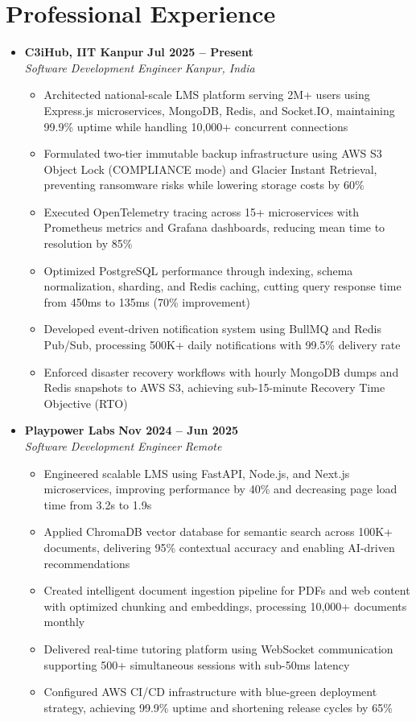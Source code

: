 \documentclass[letterpaper,10pt]{article}
\newcommand{\resumeItem}[1]{\item \small{#1}}
\newcommand{\resumeSubheading}[4]{
\item
\textbf{#1} \hfill \textbf{\small #2} \\
\textit{\small #3} \hfill \textit{\small #4}
\vspace{-4pt}
}
\begin{document}
\section{Professional Experience}
\begin{itemize}[leftmargin=0in, label={}]
\resumeSubheading
{C3iHub, IIT Kanpur}{Jul 2025 -- Present}
{Software Development Engineer}{Kanpur, India}
\begin{itemize}
\resumeItem{Architected national-scale LMS platform serving 2M+ users using Express.js microservices, MongoDB, Redis, and Socket.IO, maintaining 99.9\% uptime while handling 10,000+ concurrent connections}
\resumeItem{Formulated two-tier immutable backup infrastructure using AWS S3 Object Lock (COMPLIANCE mode) and Glacier Instant Retrieval, preventing ransomware risks while lowering storage costs by 60\%}
\resumeItem{Executed OpenTelemetry tracing across 15+ microservices with Prometheus metrics and Grafana dashboards, reducing mean time to resolution by 85\%}
\resumeItem{Optimized PostgreSQL performance through indexing, schema normalization, sharding, and Redis caching, cutting query response time from 450ms to 135ms (70\% improvement)}
\resumeItem{Developed event-driven notification system using BullMQ and Redis Pub/Sub, processing 500K+ daily notifications with 99.5\% delivery rate}
\resumeItem{Enforced disaster recovery workflows with hourly MongoDB dumps and Redis snapshots to AWS S3, achieving sub-15-minute Recovery Time Objective (RTO)}
\end{itemize}

\resumeSubheading
{Playpower Labs}{Nov 2024 -- Jun 2025}
{Software Development Engineer}{Remote}
\begin{itemize}
\resumeItem{Engineered scalable LMS using FastAPI, Node.js, and Next.js microservices, improving performance by 40\% and decreasing page load time from 3.2s to 1.9s}
\resumeItem{Applied ChromaDB vector database for semantic search across 100K+ documents, delivering 95\% contextual accuracy and enabling AI-driven recommendations}
\resumeItem{Created intelligent document ingestion pipeline for PDFs and web content with optimized chunking and embeddings, processing 10,000+ documents monthly}
\resumeItem{Delivered real-time tutoring platform using WebSocket communication supporting 500+ simultaneous sessions with sub-50ms latency}
\resumeItem{Configured AWS CI/CD infrastructure with blue-green deployment strategy, achieving 99.9\% uptime and shortening release cycles by 65\%}
\end{itemize}
\end{itemize}
\end{document}

